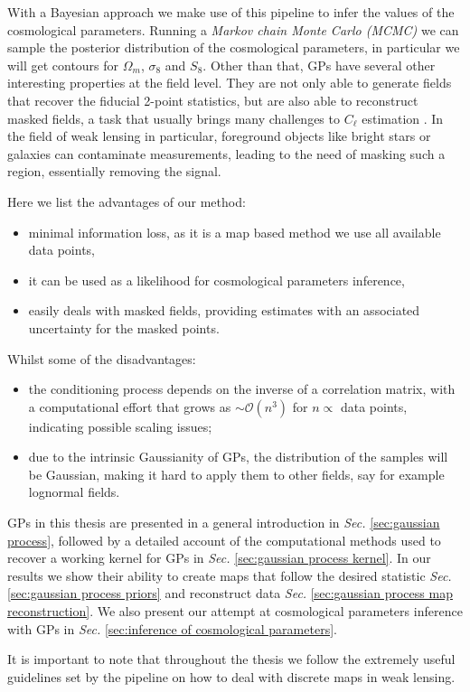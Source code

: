 With a Bayesian approach we make use of this pipeline to infer the values of the cosmological parameters. Running a \textit{Markov chain Monte Carlo (MCMC)} we can sample the posterior distribution of the cosmological parameters, in particular we will get contours for $\Omega_m$, $\sigma_8$ and $S_8$. Other than that, GPs have several other interesting properties at the field level. They are not only able to generate fields that recover the fiducial 2-point statistics, but are also able to reconstruct masked fields, a task that usually brings many challenges to $C_\ell$ estimation \cite{cellestim} \cite{cellestim2}. In the field of weak lensing in particular, foreground objects like bright stars or galaxies can contaminate measurements, leading to the need of masking such a region, essentially removing the signal.

Here we list the advantages of our method:
\begin{itemize}
    \item minimal information loss, as it is a map based method we use all available data points,
    \item it can be used as a likelihood for cosmological parameters inference,
    \item easily deals with masked fields, providing estimates with an associated uncertainty for the masked points.
\end{itemize}
Whilst some of the disadvantages:
\begin{itemize}
    \item the conditioning process depends on the inverse of a correlation matrix, with a computational effort that grows as $\sim \mathcal{O}(n^3)$ for $n\propto$ data points, indicating possible scaling issues;
    \item due to the intrinsic Gaussianity of GPs, the distribution of the samples will be Gaussian, making it hard to apply them to other fields, say for example lognormal fields.
\end{itemize}
GPs in this thesis are presented in a general introduction in \textit{Sec. }\ref{sec:gaussian process}, followed by a detailed account of the computational methods used to recover a working kernel for GPs in \textit{Sec. }\ref{sec:gaussian process kernel}. In our results we show their ability to create maps that follow the desired statistic \textit{Sec. }\ref{sec:gaussian process priors} and reconstruct data \textit{Sec. }\ref{sec:gaussian process map reconstruction}. We also present our attempt at cosmological parameters inference with GPs in \textit{Sec. }\ref{sec:inference of cosmological parameters}.

It is important to note that throughout the thesis we follow the extremely useful guidelines set by the  pipeline \cite{fwdmodel} on how to deal with discrete maps in weak lensing. 

